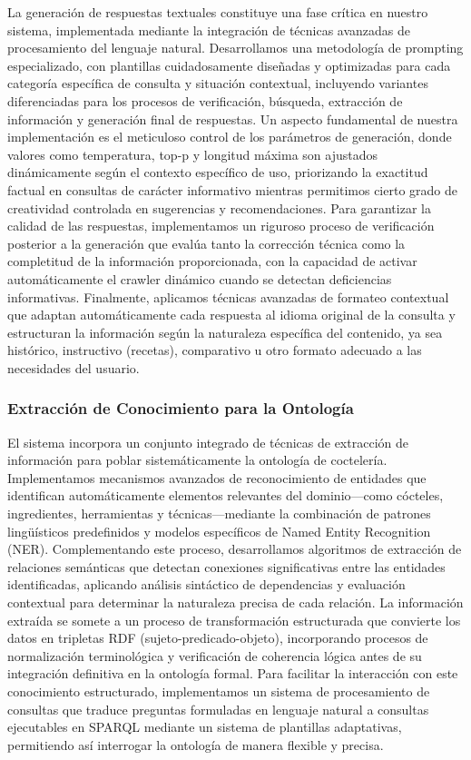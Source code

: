 \documentclass[runningheads]{llncs}
\begin{document}
La generación de respuestas textuales constituye una fase crítica en nuestro sistema, implementada mediante la integración de técnicas avanzadas de procesamiento del lenguaje natural. Desarrollamos una metodología de prompting especializado, con plantillas cuidadosamente diseñadas y optimizadas para cada categoría específica de consulta y situación contextual, incluyendo variantes diferenciadas para los procesos de verificación, búsqueda, extracción de información y generación final de respuestas. Un aspecto fundamental de nuestra implementación es el meticuloso control de los parámetros de generación, donde valores como temperatura, top-p y longitud máxima son ajustados dinámicamente según el contexto específico de uso, priorizando la exactitud factual en consultas de carácter informativo mientras permitimos cierto grado de creatividad controlada en sugerencias y recomendaciones. Para garantizar la calidad de las respuestas, implementamos un riguroso proceso de verificación posterior a la generación que evalúa tanto la corrección técnica como la completitud de la información proporcionada, con la capacidad de activar automáticamente el crawler dinámico cuando se detectan deficiencias informativas. Finalmente, aplicamos técnicas avanzadas de formateo contextual que adaptan automáticamente cada respuesta al idioma original de la consulta y estructuran la información según la naturaleza específica del contenido, ya sea histórico, instructivo (recetas), comparativo u otro formato adecuado a las necesidades del usuario.

\subsubsection{Extracción de Conocimiento para la Ontología}

El sistema incorpora un conjunto integrado de técnicas de extracción de información para poblar sistemáticamente la ontología de coctelería. Implementamos mecanismos avanzados de reconocimiento de entidades que identifican automáticamente elementos relevantes del dominio—como cócteles, ingredientes, herramientas y técnicas—mediante la combinación de patrones lingüísticos predefinidos y modelos específicos de Named Entity Recognition (NER). Complementando este proceso, desarrollamos algoritmos de extracción de relaciones semánticas que detectan conexiones significativas entre las entidades identificadas, aplicando análisis sintáctico de dependencias y evaluación contextual para determinar la naturaleza precisa de cada relación. La información extraída se somete a un proceso de transformación estructurada que convierte los datos en tripletas RDF (sujeto-predicado-objeto), incorporando procesos de normalización terminológica y verificación de coherencia lógica antes de su integración definitiva en la ontología formal. Para facilitar la interacción con este conocimiento estructurado, implementamos un sistema de procesamiento de consultas que traduce preguntas formuladas en lenguaje natural a consultas ejecutables en SPARQL mediante un sistema de plantillas adaptativas, permitiendo así interrogar la ontología de manera flexible y precisa.
\end{document}
